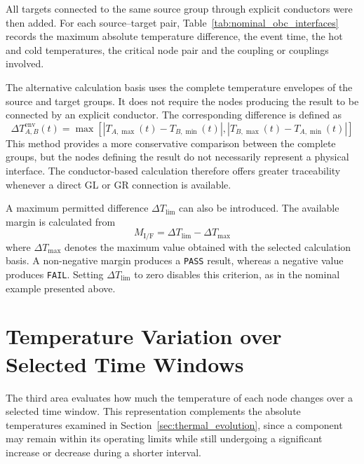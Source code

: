 All targets connected to the same source group through explicit conductors
were then added. For each source--target pair,
Table~\ref{tab:nominal_obc_interfaces} records the maximum absolute
temperature difference, the event time, the hot and cold temperatures, the
critical node pair and the coupling or couplings involved.


\NominalOBCInterfaceTable[1.0\textwidth]

The alternative calculation basis uses the complete temperature envelopes of
the source and target groups. It does not require the nodes producing the
result to be connected by an explicit conductor. The corresponding difference is
defined as
\begin{equation}
    \Delta T_{A,B}^{\mathrm{env}}(t)
    =
    \max\!\left[
        \left|T_{A,\max}(t)-T_{B,\min}(t)\right|,
        \left|T_{B,\max}(t)-T_{A,\min}(t)\right|
    \right]
    \label{eq:if_group_envelope}
\end{equation}
This method provides a more conservative comparison between the complete
groups, but the nodes defining the result do not necessarily represent a
physical interface. The conductor-based calculation therefore offers greater
traceability whenever a direct GL or GR connection is available.

A maximum permitted difference \(\Delta T_{\mathrm{lim}}\) can also be
introduced. The available margin is calculated from
\begin{equation}
    M_{\mathrm{I/F}}
    =
    \Delta T_{\mathrm{lim}}
    -
    \Delta T_{\max}
    \label{eq:if_margin}
\end{equation}
where \(\Delta T_{\max}\) denotes the maximum value obtained with the selected
calculation basis. A non-negative margin produces a \texttt{PASS} result,
whereas a negative value produces \texttt{FAIL}. Setting
\(\Delta T_{\mathrm{lim}}\) to zero disables this criterion, as in the
nominal example presented above.

\section{Temperature Variation over Selected Time Windows}
\label{sec:temperature_time_windows}

The third area evaluates how much the temperature of each node changes over a
selected time window. This representation complements the absolute
temperatures examined in Section~\ref{sec:thermal_evolution}, since a
component may remain within its operating limits while still undergoing a
significant increase or decrease during a shorter interval.

